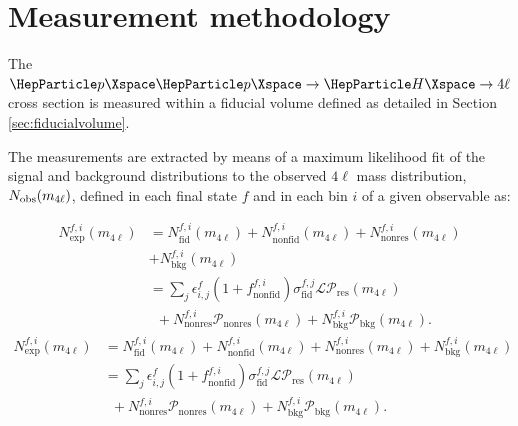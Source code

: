 \section{Measurement methodology}
\label{sec:measurement}

The $\Pp\Pp\to\Hllll$ cross section is measured within a fiducial volume defined as detailed in Section \ref{sec:fiducialvolume}.

The measurements are extracted by means of a maximum likelihood fit of the signal and background distributions to the observed $4\ell$
mass distribution, $N_{\mathrm{obs}}(m_{4\ell})$, defined in each final state $f$ and in each bin $i$ of a given observable as:

\begin{linenomath}
	{
		\begin{equation}
		\label{eqn:m4l}
		\begin{aligned}
		N_{\mathrm{exp}}^{f,i}(m_{4\ell}) &= N_{\mathrm{fid}}^{f,i}(m_{4\ell})+N_{\mathrm{nonfid}}^{f,i}(m_{4\ell})+N_{\mathrm{nonres}}^{f,i}(m_{4\ell})\\
		&+N_{\text{bkg}}^{f,i}(m_{4\ell}) \\
		&=\sum_j\epsilon_{i,j}^{f}  \left(1+f_{\mathrm{nonfid}}^{f,i} \right)\sigma_{\mathrm{fid}}^{f,j}  \mathcal{L}\mathcal{P}_{\mathrm{res}}(m_{4\ell}) \\
		&\,\,\,+ N_{\mathrm{nonres}}^{f,i}\mathcal{P}_{\mathrm{nonres}}(m_{4\ell})+N_{\text{bkg}}^{f,i}\mathcal{P}_{\text{bkg}}(m_{4\ell}).
		\end{aligned}
		\end{equation}
	}
	{
		\begin{equation}
		\label{eqn:m4l}
		\begin{aligned}
		N_{\mathrm{exp}}^{f,i}(m_{4\ell}) &= N_{\mathrm{fid}}^{f,i}(m_{4\ell})+N_{\mathrm{nonfid}}^{f,i}(m_{4\ell})+N_{\mathrm{nonres}}^{f,i}(m_{4\ell})+N_{\text{bkg}}^{f,i}(m_{4\ell}) \\
		&=\sum_j\epsilon_{i,j}^{f}  \left(1+f_{\mathrm{nonfid}}^{f,i} \right)\sigma_{\mathrm{fid}}^{f,j}  \mathcal{L}\mathcal{P}_{\mathrm{res}}(m_{4\ell}) \\
		&\,\,\,+ N_{\mathrm{nonres}}^{f,i}\mathcal{P}_{\mathrm{nonres}}(m_{4\ell})+N_{\text{bkg}}^{f,i}\mathcal{P}_{\text{bkg}}(m_{4\ell}).
		\end{aligned}
		\end{equation}
	}
\end{linenomath}

